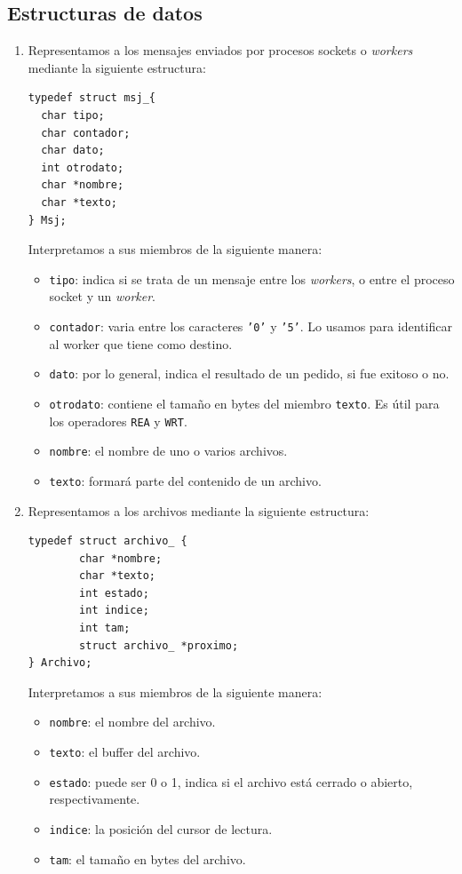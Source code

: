 \documentclass[a4paper, 8pt]{article}
\begin{document}
\subsection{Estructuras de datos}
\begin{enumerate}
\item Representamos a los mensajes enviados por procesos sockets o \textit{workers} mediante la siguiente estructura:
\begin{verbatim}
typedef struct msj_{
  char tipo;
  char contador;
  char dato;
  int otrodato;
  char *nombre;
  char *texto;
} Msj;
\end{verbatim}

\newpage
Interpretamos a sus miembros de la siguiente manera:

\begin{itemize}
  \item \texttt{tipo}: indica si se trata de un mensaje entre los \textit{workers}, o entre el proceso socket y un \textit{worker}.
  \item \texttt{contador}: varia entre los caracteres \texttt{'0'} y \texttt{'5'}. Lo usamos para identificar al worker que tiene como destino.
  \item \texttt{dato}: por lo general, indica el resultado de un pedido, si fue exitoso o no.
  \item \texttt{otrodato}: contiene el tamaño en bytes del miembro \texttt{texto}. Es útil para los operadores \texttt{REA} y \texttt{WRT}.
  \item \texttt{nombre}: el nombre de uno o varios archivos.
  \item \texttt{texto}: formará parte del contenido de un archivo.
\end{itemize}

\item Representamos a los archivos mediante la siguiente estructura:

\begin{verbatim}
typedef struct archivo_ {
	    char *nombre;
	    char *texto;
	    int estado;
	    int indice;
	    int tam;
	    struct archivo_ *proximo;
} Archivo;
\end{verbatim}

Interpretamos a sus miembros de la siguiente manera:

\begin{itemize}
  \item \texttt{nombre}: el nombre del archivo.
  \item \texttt{texto}: el buffer del archivo.
  \item \texttt{estado}: puede ser 0 o 1, indica si el archivo está cerrado o abierto, respectivamente.
  \item \texttt{indice}: la posición del cursor de lectura.
  \item \texttt{tam}: el tamaño en bytes del archivo.
\end{itemize}

\end{enumerate}
\end{document}
